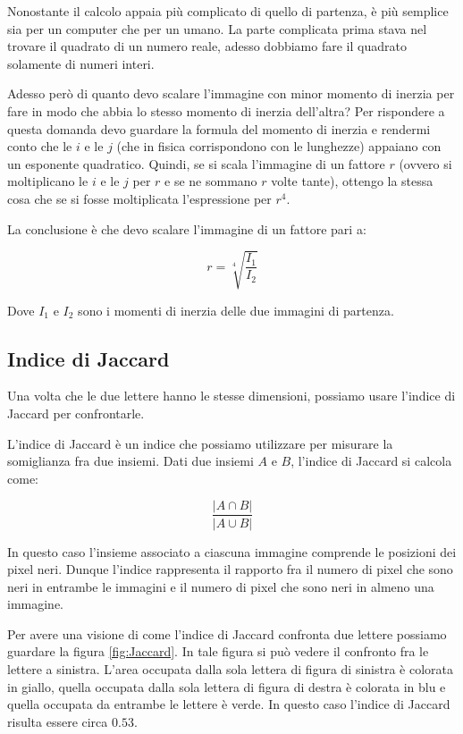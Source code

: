 Nonostante il calcolo appaia pi\`u complicato di quello di partenza, \`e pi\`u semplice sia per un computer che per un umano. La parte complicata prima stava nel trovare il quadrato di un numero reale, adesso dobbiamo fare il quadrato solamente di numeri interi.

Adesso per\`o di quanto devo scalare l'immagine con minor momento di inerzia per fare in modo che abbia lo stesso momento di inerzia dell'altra? Per rispondere a questa domanda devo guardare la formula del momento di inerzia e rendermi conto che le $i$ e le $j$ (che in fisica corrispondono con le lunghezze) appaiano con un esponente quadratico. Quindi, se si scala l'immagine di un fattore $r$ (ovvero si moltiplicano le $i$ e le $j$ per $r$ e se ne sommano $r$ volte tante), ottengo la stessa cosa che se si fosse moltiplicata l'espressione per $r^4$.

La conclusione \`e che devo scalare l'immagine di un fattore pari a:

\begin{equation*}
    r = \sqrt[4]{\frac{I_1}{I_2}}
\end{equation*}

Dove $I_1$ e $I_2$ sono i momenti di inerzia delle due immagini di partenza.

\subsection{Indice di Jaccard}\label{ssect:jaccard}

Una volta che le due lettere hanno le stesse dimensioni, possiamo usare l'indice di Jaccard per confrontarle.

L'indice di Jaccard \`e un indice che possiamo utilizzare per misurare la somiglianza fra due insiemi. Dati due insiemi $A$ e $B$, l'indice di Jaccard si calcola come:

\begin{equation*}
    \frac{\vert A \cap B \vert}{\vert A \cup B \vert}
\end{equation*}

In questo caso l'insieme associato a ciascuna immagine comprende le posizioni dei pixel neri. Dunque l'indice rappresenta il rapporto fra il numero di pixel che sono neri in entrambe le immagini e il numero di pixel che sono neri in almeno una immagine.

Per avere una visione di come l'indice di Jaccard confronta due lettere possiamo guardare la figura \ref{fig:Jaccard}. In tale figura si pu\`o vedere il confronto fra le lettere a sinistra. L'area occupata dalla sola lettera di figura di sinistra \`e colorata in giallo, quella occupata dalla sola lettera di figura di destra \`e colorata in blu e quella occupata da entrambe le lettere \`e verde. In questo caso l'indice di Jaccard risulta essere circa $0.53$.

